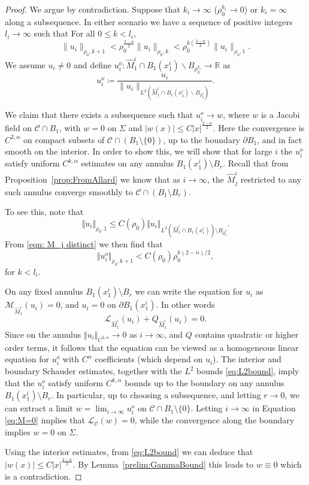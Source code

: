 \documentclass[10pt,a4paper]{amsart}
\begin{document}
\begin{proof}
We argue by contradiction. Suppose that $k_i\rightarrow \infty$ ($\rho_0^{k_i}\rightarrow 0$) or $k_i=\infty$ along a subsequence. In either scenario we have a sequence of positive integers $l_i\rightarrow \infty$ such that 
For all $0\leq k<l_i$, 
\begin{equation}\label{eqn: M_j distinct}
 \|u_i\|_{\rho_0, k+1}< \rho_0^{\frac{2-n}{2}}\|u_i\|_{\rho_0, k}<\rho_0^{k(\frac{2-n}{2})}\|u_i\|_{\rho_0, 1}.
\end{equation}
We assume $u_i\neq 0$ and define $u_i^o:\hat M_1^i\cap B_1(x_1^i)\backslash B_{\rho_0^{k_i}}\rightarrow \mathbb R$ as
$$ u_i^o\coloneqq\frac{u_i}{\|u_i\|_{L^2(\hat M_1^i\cap B_1(x_1^i)\backslash B_{\rho_0^2})}}. $$

We claim that there exists a subsequence such that $u_i^o \rightarrow w$, where $w$ is a Jacobi field on $\mathcal C \cap B_1$, with $w=0$ on $\Sigma$ and $|w(x)| \leq C |x|^{\frac{2-n}{2}}$. Here the convergence is $C^{2,\alpha}$ on compact subsets of $\mathcal{C}\cap (B_1\setminus \{0\})$, up to the boundary $\partial B_1$, and in fact smooth on the interior. In order to show this, we will show that for large $i$ the $u^o_i$ satisfy uniform $C^{k,\alpha}$ estimates on any annulus $B_1(x^i_1)\setminus B_r$. Recall that from Proposition~\ref{prop:FromAllard} we know that as $i\to \infty$, the $\hat{M}^i_j$ restricted to any such annulus converge smoothly to $\mathcal{C}\cap (B_1\setminus B_r)$. 

To see this, note that
\[ \Vert u_i\Vert_{\rho_0,1} \leq C(\rho_0) \Vert u_i\Vert_{L^2(\hat{M}^i_1\cap B_1(x^i_1))\setminus B_{\rho_0^2}}. \]
From \eqref{eqn: M_j distinct} we then find that
\begin{equation}\label{eq:L2bound} \Vert u^o_i\Vert_{\rho_0, k+1} < C(\rho_0) \rho_0^{k(2-n)/2}, 
\end{equation}
for $k < l_i$. 

On any fixed annulus $B_1(x^i_1)\setminus B_r$ we can write the equation for $u_i$ as $\mathcal{M}_{\hat{M}_1^i}(u_i)=0$, and $u_i=0$ on $\partial B_1(x^i_1)$. In other words
\begin{equation}\label{eq:M=0} \mathcal{L}_{\hat{M}^i_1}(u_i) + Q_{\hat{M}^i_1}(u_i) = 0. 
\end{equation}
Since on the annulus $\Vert u_i\Vert_{C^{2,\alpha}}\to 0$ as $i\to\infty$, and $Q$ contains quadratic or higher order terms, it follows that the equation can be viewed as a homogeneous linear equation for $u_i^o$ with $C^\alpha$ coefficients (which depend on $u_i$). The interior and boundary Schauder estimates, together with the $L^2$ bounds \eqref{eq:L2bound}, imply that the $u_i^o$ satisfy uniform $C^{k,\alpha}$ bounds up to the boundary on any annulus $B_1(x^i_1)\setminus B_r$. In particular, up to choosing a subsequence, and letting $r\to 0$, we can extract a limit $w = \lim_{i\to\infty} u^o_i$ on $\mathcal{C}\cap B_1\setminus \{0\}$. Letting $i\to \infty$ in Equation \eqref{eq:M=0} implies that  $\mathcal{L}_{\mathcal{C}}(w)=0$, while the convergence along the boundary implies $w=0$ on $\Sigma$. 

Using the interior estimates, from \eqref{eq:L2bound} we can deduce that  $|w(x)|\leq C|x|^{\frac{2-n}{2}}.$ By Lemma~\ref{prelim:GammaBound} this leads to  $w\equiv 0$ which is a contradiction. 
\end{proof}
\end{document}
